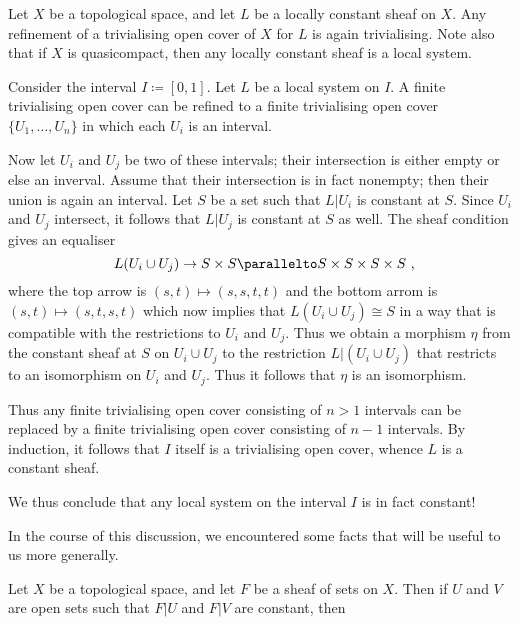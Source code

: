 \begin{nul}
	Let $ X $ be a topological space, and let $ L $ be a locally constant sheaf on $ X $. 
	Any refinement of a trivialising open cover of $ X $ for $ L $ is again trivialising.
	Note also that if $ X $ is quasicompact, then any locally constant sheaf is a local system.
\end{nul}

\begin{exm}
	Consider the interval $ I \coloneq [0, 1] $.
	Let $ L $ be a local system on $ I $.
	A finite trivialising open cover can be refined to a finite trivialising open cover $ \{ U_1, \dots, U_n \} $ in which each $ U_{i} $ is an interval.

	Now let $ U_{i} $ and $ U_{j} $ be two of these intervals;
	their intersection is either empty or else an inverval.
	Assume that their intersection is in fact nonempty;
	then their union is again an interval.
	Let $ S $ be a set such that $ L | U_{i} $ is constant at $ S $.
	Since $ U_{i} $ and $ U_{j} $ intersect, it follows that $ L | U_{j} $ is constant at $ S $ as well.
	The sheaf condition gives an equaliser
	\[
		L(U_{i} \cup U_{j}) \to S \times S \parallelto S \times S \times S \times S \comma
	\]
	where the top arrow is $ (s, t) \mapsto (s, s, t, t) $ and the bottom arrom is $ (s, t) \mapsto (s, t, s, t) $ which now implies that $ L(U_{i} \cup U_{j}) \cong S $ in a way that is compatible with the restrictions to $ U_{i} $ and $ U_{j} $.
	Thus we obtain a morphism $ \eta $ from the constant sheaf at $ S $ on $ U_{i} \cup U_{j} $ to the restriction $ L | (U_{i} \cup U_{j}) $
	that restricts to an isomorphism on $ U_{i} $ and $ U_{j} $.
	Thus it follows that $ \eta $ is an isomorphism.

	Thus any finite trivialising open cover consisting of $ n > 1$ intervals can be replaced by a finite trivialising open cover consisting of $ n - 1 $ intervals.
	By induction, it follows that $ I $ itself is a trivialising open cover, whence $ L $ is a constant sheaf.

	We thus conclude that any local system on the interval $ I $ is in fact constant!
\end{exm}

In the course of this discussion, we encountered some facts that will be useful to us more generally.

\begin{lem}
	Let $ X $ be a topological space, and let $ F $ be a sheaf of sets on $ X $.
	Then if $ U $ and $ V $ are open sets such that $ F | U $ and $ F | V $ are constant, then 
\end{lem}




